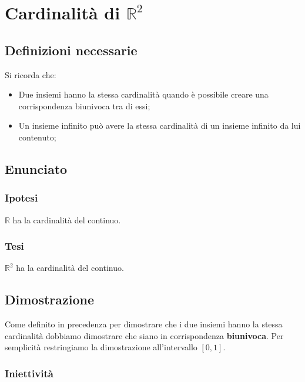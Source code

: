 \documentclass[../dimostrazioni]{subfiles}
\begin{document}
    \chapter{Cardinalità di \(\mathbb{R}^2\)}

        \section*{Definizioni necessarie}

            Si ricorda che:

            \begin{itemize}
                \item Due insiemi hanno la stessa cardinalità quando è possibile creare una corrispondenza biunivoca tra di essi;
                \item Un insieme infinito può avere la stessa cardinalità di un insieme infinito da lui contenuto;
            \end{itemize}

        \section*{Enunciato}

            \subsection*{Ipotesi}

            \( \mathbb{R} \) ha la cardinalità del continuo.

            \subsection*{Tesi}

            \( \mathbb{R}^2 \) ha la cardinalità del continuo.                

        \section*{Dimostrazione}

            Come definito in precedenza per dimostrare che i due insiemi hanno la stessa cardinalità 
            dobbiamo dimostrare che siano in corrispondenza \textbf{biunivoca}. 
            Per semplicità restringiamo la dimostrazione all'intervallo \([0, 1]\).
            
            \subsection*{Iniettività}
\end{document}
